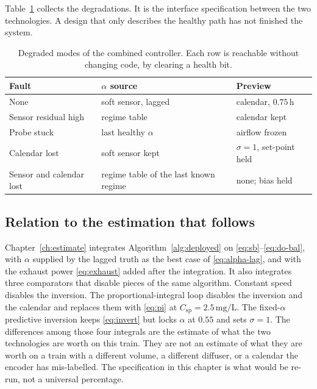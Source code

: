 Table~\ref{tab:degrade} collects the degradations. It is the interface specification between the two technologies. A design that only describes the healthy path has not finished the system.

\begin{table}[ht]
\centering
\caption{Degraded modes of the combined controller. Each row is reachable without changing code, by clearing a health bit.}
\label{tab:degrade}
\begin{tabular}{@{}p{3.4cm}p{4.2cm}p{5.4cm}@{}}
\toprule
Fault & $\alpha$ source & Preview \\
\midrule
None & soft sensor, lagged & calendar, $0.75\,\mathrm{h}$ \\
Sensor residual high & regime table & calendar kept \\
Probe stuck & last healthy $\alpha$ & airflow frozen \\
Calendar lost & soft sensor kept & $\sigma=1$, set-point held \\
Sensor and calendar lost & regime table of the last known regime & none; bias held \\
\bottomrule
\end{tabular}
\end{table}

\subsection{Relation to the estimation that follows}

Chapter~\ref{ch:estimate} integrates Algorithm~\ref{alg:deployed} on \eqref{eq:sb}--\eqref{eq:do-bal}, with $\alpha$ supplied by the lagged truth as the best case of \eqref{eq:alpha-lag}, and with the exhaust power \eqref{eq:exhaust} added after the integration. It also integrates three comparators that disable pieces of the same algorithm. Constant speed disables the inversion. The proportional-integral loop disables the inversion and the calendar and replaces them with \eqref{eq:pi} at $C_{\mathrm{sp}}=2.5\,\mathrm{mg/L}$. The fixed-$\alpha$ predictive inversion keeps \eqref{eq:invert} but locks $\alpha$ at $0.55$ and sets $\sigma=1$. The differences among those four integrals are the estimate of what the two technologies are worth on this train. They are not an estimate of what they are worth on a train with a different volume, a different diffuser, or a calendar the encoder has mis-labelled. The specification in this chapter is what would be re-run, not a universal percentage.
